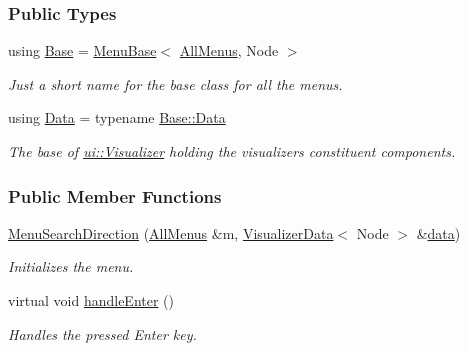 \subsubsection*{Public Types}
\begin{DoxyCompactItemize}
\item 
using \hyperlink{structMenuSearchDirection_a7a953ff9c4822d6dd837455a0e8cfba7}{Base} = \hyperlink{structMenuBase}{Menu\+Base}$<$ \hyperlink{structAllMenus}{All\+Menus}, Node $>$\hypertarget{structMenuSearchDirection_a7a953ff9c4822d6dd837455a0e8cfba7}{}\label{structMenuSearchDirection_a7a953ff9c4822d6dd837455a0e8cfba7}

\begin{DoxyCompactList}\small\item\em Just a short name for the base class for all the menus. \end{DoxyCompactList}\item 
using \hyperlink{structMenuSearchDirection_aeedb71eccc9c1bbcfeb6a7c1fbf2075c}{Data} = typename \hyperlink{structMenuBase_a473a45fd8adbc75a9220b64753ae3837}{Base\+::\+Data}\hypertarget{structMenuSearchDirection_aeedb71eccc9c1bbcfeb6a7c1fbf2075c}{}\label{structMenuSearchDirection_aeedb71eccc9c1bbcfeb6a7c1fbf2075c}

\begin{DoxyCompactList}\small\item\em The base of \hyperlink{structui_1_1Visualizer}{ui\+::\+Visualizer} holding the visualizer\textquotesingle{}s constituent components. \end{DoxyCompactList}\end{DoxyCompactItemize}
\subsubsection*{Public Member Functions}
\begin{DoxyCompactItemize}
\item 
\hyperlink{structMenuSearchDirection_a29c176c8b46b3cf430b4a0d509a17ce8}{Menu\+Search\+Direction} (\hyperlink{structAllMenus}{All\+Menus} \&m, \hyperlink{structVisualizerData}{Visualizer\+Data}$<$ Node $>$ \&\hyperlink{structMenuBase_a819aaaa06ede3bffbb12c1390657ef64}{data})
\begin{DoxyCompactList}\small\item\em Initializes the menu. \end{DoxyCompactList}\item 
virtual void \hyperlink{structMenuSearchDirection_a5fecd2474811750f0d4dea28552bc4ee}{handle\+Enter} ()\hypertarget{structMenuSearchDirection_a5fecd2474811750f0d4dea28552bc4ee}{}\label{structMenuSearchDirection_a5fecd2474811750f0d4dea28552bc4ee}

\begin{DoxyCompactList}\small\item\em Handles the pressed Enter key. \end{DoxyCompactList}\end{DoxyCompactItemize}
